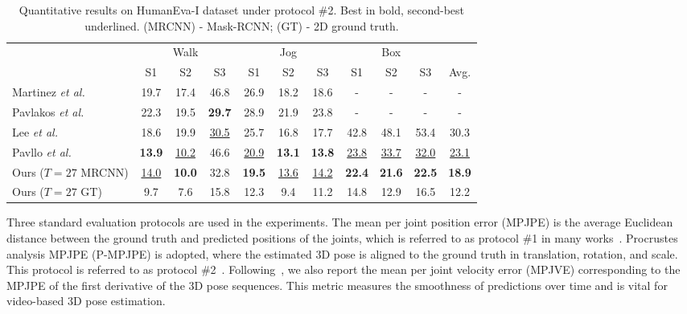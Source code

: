 \documentclass[journal]{IEEEtran}
\begin{document}
\begin{table}[ht]
   \centering
   \scriptsize
   \caption
   {
      Quantitative results on HumanEva-I dataset under protocol \#2. 
      Best in bold, second-best underlined.
      (MRCNN) - Mask-RCNN; 
      (GT) - 2D ground truth. 
   }
   \setlength{\tabcolsep}{0.95mm} 
   \begin{tabular}{@{}l|ccc|ccc|ccc|c@{}}
   \toprule[1pt]
   & \multicolumn{3}{c}{Walk} & \multicolumn{3}{c}{Jog} &
   \multicolumn{3}{c}{Box} \\
   & S1 & S2 & S3 & S1 & S2 & S3 & S1 & S2 & S3 & Avg. \\
   \midrule[0.5pt]

   Martinez \emph{et al.}~\cite{martinez2017simple} &19.7 &17.4 &46.8 &26.9 &18.2 &18.6 &- &- &- &-\\

   Pavlakos \emph{et al.}~\cite{pavlakos2017coarse} &22.3 &19.5 &\textbf{29.7} &28.9 &21.9 &23.8 &- &- &- &-\\

   Lee \emph{et al.}~\cite{lee2018propagating} &18.6 &19.9 &\underline{30.5} &25.7 &16.8 &17.7 &42.8 &48.1 &53.4 &30.3 \\

   Pavllo \emph{et al.}~\cite{pavllo20193d} &\textbf{13.9} &\underline{10.2} &46.6 &\underline{20.9} &\textbf{13.1} &\textbf{13.8} &\underline{23.8} &\underline{33.7} &\underline{32.0} &\underline{23.1} \\

   \midrule[0.5pt]
   Ours ($T=27$ MRCNN) &\underline{14.0} &\textbf{10.0} &32.8 &\textbf{19.5} &\underline{13.6} &\underline{14.2} &\textbf{22.4} &\textbf{21.6} &\textbf{22.5} &\textbf{18.9} \\
   \midrule[0.5pt]

   Ours ($T=27$ GT) &9.7 &7.6 &15.8 &12.3 &9.4 &11.2 &14.8 &12.9 &16.5 &12.2 \\
   \toprule[1pt]
   \end{tabular}
   \label{table:humaneva_eval}
\end{table} 

Three standard evaluation protocols are used in the experiments. 
The mean per joint position error (MPJPE) is the average Euclidean distance between the ground truth and predicted positions of the joints, which is referred to as protocol \#1 in many works~\cite{fang2018learning,kocabas2019self}. 
Procrustes analysis MPJPE (P-MPJPE) is adopted, where the estimated 3D pose is aligned to the ground truth in translation, rotation, and scale. 
This protocol is referred to as protocol \#2~\cite{martinez2017simple,rayat2018exploiting}.
Following~\cite{pavllo20193d,chen2021anatomy,wang2020motion}, we also report the mean per joint velocity error (MPJVE) corresponding to the MPJPE of the first derivative of the 3D pose sequences. 
This metric measures the smoothness of predictions over time and is vital for video-based 3D pose estimation.
\end{document}
